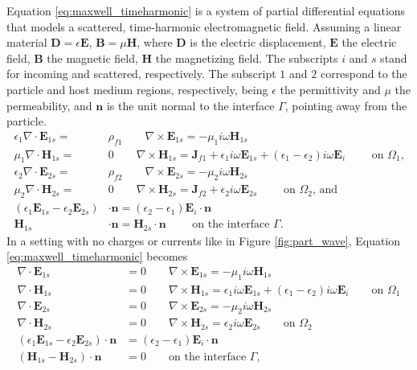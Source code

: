 Equation \eqref{eq:maxwell_timeharmonic} is a system of partial differential equations that
models a scattered, time-harmonic electromagnetic field. Assuming a linear material 
$\mathbf{D}=\epsilon\mathbf{E}$, $\mathbf{B}=\mu\mathbf{H}$, where $\mathbf{D}$ is the electric
displacement, $\mathbf{E}$ the electric field, $\mathbf{B}$ the magnetic field, $\mathbf{H}$ the magnetizing 
field. The subscripts $i$ and $s$ stand for incoming and scattered, respectively. The subscript $1$ and $2$ 
correspond to the particle and host medium regions, respectively, being $\epsilon$ the permittivity and $\mu$ 
the permeability, and $\mathbf{n}$ is the unit normal to the interface $\Gamma$, pointing away from the particle. 
%
\begin{align} \label{eq:maxwell_timeharmonic}
   \epsilon_1 \nabla \cdot \mathbf{E}_{1s} =& \rho_{f1} \qquad \nabla \times \mathbf{E}_{1s} = -\mu_1i\omega\mathbf{H}_{1s} \nonumber \\
   \mu_1\nabla \cdot \mathbf{H}_{1s} =& 0 \qquad \nabla \times \mathbf{H}_{1s} = \mathbf{J}_{f1} + \epsilon_1i\omega\mathbf{E}_{1s} + (\epsilon_1-\epsilon_2)i\omega\mathbf{E}_{i}\qquad \text{ on $\Omega_1$,} \nonumber \\
   \epsilon_2 \nabla \cdot \mathbf{E}_{2s} =& \rho_{f2} \qquad \nabla \times \mathbf{E}_{2s} = -\mu_2i\omega \mathbf{H}_{2s} \nonumber \\
   \mu_2\nabla \cdot \mathbf{H}_{2s} =& 0 \qquad \nabla \times \mathbf{H}_{2s} = \mathbf{J}_{f2} + \epsilon_2i\omega\mathbf{E}_{2s} \qquad \text{ on $\Omega_2$, and} \nonumber \\
   (\epsilon_1\mathbf{E}_{1s}-\epsilon_2\mathbf{E}_{2s})&\cdot\mathbf{n} = (\epsilon_2-\epsilon_1)\mathbf{E}_i\cdot\mathbf{n} \nonumber \\
   \mathbf{H}_{1s}&\cdot \mathbf{n} = \mathbf{H}_{2s}\cdot\mathbf{n} \qquad\text{ on the interface $\Gamma$}.
\end{align} 
%
In a setting with no charges or currents like in Figure \ref{fig:part_wave}, Equation \eqref{eq:maxwell_timeharmonic} becomes
%
\begin{align} \label{eq:maxwell_nocharge}
\nabla \cdot \mathbf{E}_{1s} &= 0 \qquad \nabla \times \mathbf{E}_{1s} = -\mu_1i\omega\mathbf{H}_{1s} \nonumber \\
\nabla \cdot \mathbf{H}_{1s} &= 0 \qquad \nabla \times \mathbf{H}_{1s} = \epsilon_1i\omega\mathbf{E}_{1s} + (\epsilon_1-\epsilon_2)i\omega\mathbf{E}_{i} \qquad \text{on $\Omega_1$} \nonumber \\
\nabla \cdot \mathbf{E}_{2s} &= 0 \qquad \nabla \times \mathbf{E}_{2s} = -\mu_2i\omega\mathbf{H}_{2s} \nonumber \\
\nabla \cdot \mathbf{H}_{2s} &= 0 \qquad \nabla \times \mathbf{H}_{2s} = \epsilon_2i\omega\mathbf{E}_{2s} \qquad \text{on $\Omega_2$} \nonumber \\
(\epsilon_1\mathbf{E}_{1s} - \epsilon_2\mathbf{E}_{2s})\cdot\mathbf{n} &= (\epsilon_2-\epsilon_1)\mathbf{E}_i\cdot \mathbf{n} \nonumber \\(\mathbf{H}_{1s} - \mathbf{H}_{2s})\cdot \mathbf{n}&=0 \qquad \text{on the interface $\Gamma$,}
\end{align}
